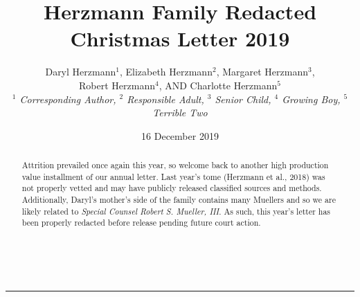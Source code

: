 \documentclass[letterpaper,11pt]{article}
\title{\vspace{-2.0cm}Herzmann Family Redacted Christmas Letter 2019}
\author{Daryl Herzmann${}^1$, Elizabeth Herzmann${}^2$, Margaret 
Herzmann${}^3$,\\
Robert Herzmann${}^4$, AND Charlotte Herzmann${}^5$ \\
\it{${}^1$ Corresponding Author},
\it{${}^2$ Responsible Adult},
\it{${}^3$ Senior Child},
\it{${}^4$ Growing Boy},
\it{${}^5$ Terrible Two}}
\date{16 December 2019}
\newcommand{\Line}[0]{%
  \rule{0cm}{0cm}\\\hrule\rule{0cm}{0cm}%
}
\begin{document}
\maketitle
\vspace{-0.75cm}
\begin{abstract}
Attrition prevailed once again this year, so welcome back to another 
high production value installment
of our annual letter.  Last year's tome (Herzmann et al., 2018) was not properly
vetted and may have publicly released classified sources and methods.
Additionally, Daryl's mother's side of the family contains many Muellers 
and so we are likely related to \textit{Special Counsel Robert S. Mueller, III}.  
As such, this year's letter has been properly redacted before release pending
future court action.
\end{abstract}

\vspace{-0.5cm}
\Line
\end{document}
